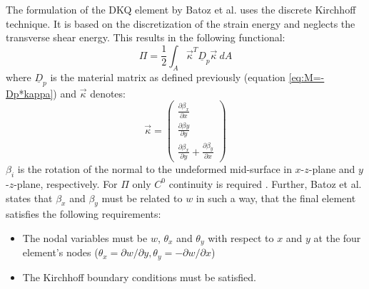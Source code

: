   The formulation of the DKQ element by Batoz et al. \cite{batoz1982evaluation} uses the discrete Kirchhoff technique. It is based on the discretization of the strain energy and neglects the transverse shear energy. This results in the following functional:
  \begin{equation}
  \Pi = \frac{1}{2} \int_A \vec{\kappa}^T \underline{D}_p \vec{\kappa}\ d\!A
  \end{equation}
  where $\underline{D}_p$ is the material matrix as defined previously (equation \eqref{eq:M=-Dp*kappa}) and $\vec{\kappa}$ denotes:
  \begin{equation}
  \vec{\kappa} = \begin{pmatrix}
  \frac{\partial \beta_x}{\partial x}\\
  \frac{\partial \beta y}{\partial y}\\
  \frac{\partial \beta_x}{\partial y} + \frac{\partial \beta_y}{\partial x}
  \end{pmatrix}
  \end{equation}
  $\beta_i$ is the rotation of the normal to the undeformed mid-surface in $x$-$z$-plane and $y$-$z$-plane, respectively. For $\Pi$ only $C^0$ continuity is required \cite{batoz1982evaluation}. Further, Batoz et al. states that $\beta_x$ and $\beta_y$ must be related to $w$ in such a way, that the final element satisfies the following requirements:
  \begin{itemize}
  	\item The nodal variables must be $w$, $\theta_x$ and $\theta_y$ with respect to $x$ and $y$ at the four element's nodes ($\theta_x = \partial w/\partial y, \theta_y=-\partial w/\partial x$)
  	\item The Kirchhoff boundary conditions must be satisfied.
  \end{itemize}
      
